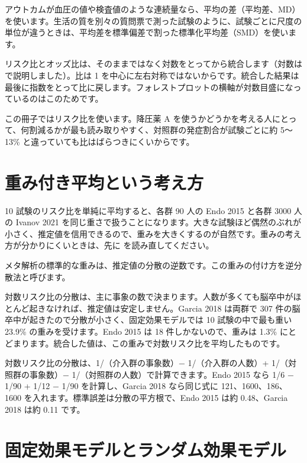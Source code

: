 アウトカムが血圧の値や検査値のような連続量なら、平均の差（平均差、MD）を使います。生活の質を別々の質問票で測った試験のように、試験ごとに尺度の単位が違うときは、平均差を標準偏差で割った標準化平均差（SMD）を使います。

リスク比とオッズ比は、そのままではなく対数をとってから統合します（対数は  で説明しました）。比は 1 を中心に左右対称ではないからです。統合した結果は最後に指数をとって比に戻します。フォレストプロットの横軸が対数目盛になっているのはこのためです。

この冊子ではリスク比を使います。降圧薬 A を使うかどうかを考える人にとって、何割減るかが最も読み取りやすく、対照群の発症割合が試験ごとに約 5〜13\% と違っていても比はばらつきにくいからです。

\section{重み付き平均という考え方}
\label{sec:05-3}

10 試験のリスク比を単純に平均すると、各群 90 人の Endo 2015 と各群 3000 人の Ivanov 2021 を同じ重さで扱うことになります。大きな試験ほど偶然のぶれが小さく、推定値を信用できるので、重みを大きくするのが自然です。重みの考え方が分かりにくいときは、先に  を読み直してください。

メタ解析の標準的な重みは、推定値の分散の逆数です。この重みの付け方を逆分散法と呼びます。

対数リスク比の分散は、主に事象の数で決まります。人数が多くても脳卒中がほとんど起きなければ、推定値は安定しません。Garcia 2018 は両群で 307 件の脳卒中が起きたので分散が小さく、固定効果モデルでは 10 試験の中で最も重い 23.9\% の重みを受けます。Endo 2015 は 18 件しかないので、重みは 1.3\% にとどまります。統合した値は、この重みで対数リスク比を平均したものです。

\begin{KKfbox9ao}[計算の補足]
対数リスク比の分散は、1/（介入群の事象数）− 1/（介入群の人数）+ 1/（対照群の事象数）− 1/（対照群の人数）で計算できます。Endo 2015 なら 1/6 − 1/90 + 1/12 − 1/90 を計算し、Garcia 2018 なら同じ式に 121、1600、186、1600 を入れます。標準誤差は分散の平方根で、Endo 2015 は約 0.48、Garcia 2018 は約 0.11 です。
\end{KKfbox9ao}

\section{固定効果モデルとランダム効果モデル}
\label{sec:05-4}

